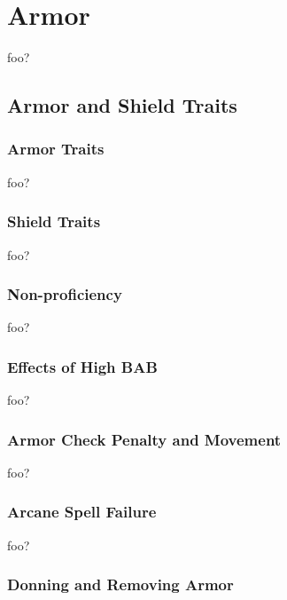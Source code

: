 \section{Armor}

foo?

\subsection{Armor and Shield Traits}

\subsubsection{Armor Traits}

foo?

\subsubsection{Shield Traits}

foo?

\subsubsection{Non-proficiency}

foo?

\subsubsection{Effects of High BAB}

foo?

\subsubsection{Armor Check Penalty and Movement}

foo?

\subsubsection{Arcane Spell Failure}

foo?

\subsubsection{Donning and Removing Armor}

